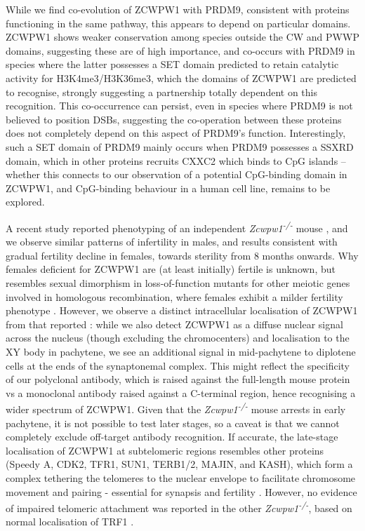 While we find co-evolution of ZCWPW1 with PRDM9, consistent with proteins functioning in the same pathway, this appears to depend on particular domains.
ZCWPW1 shows weaker conservation among species outside the CW and PWWP domains, suggesting these are of high importance, and co-occurs with PRDM9 in species where the latter possesses a SET domain predicted to retain catalytic activity for H3K4me3/H3K36me3, which the domains of ZCWPW1 are predicted to recognise, strongly suggesting a partnership totally dependent on this recognition.
This co-occurrence can persist, even in species where PRDM9 is not believed to position DSBs, suggesting the co-operation between these proteins does not completely depend on this aspect of PRDM9’s function.
Interestingly, such a SET domain of PRDM9 mainly occurs when PRDM9 possesses a SSXRD domain, which in other proteins \parencite{Banito2018SS18SSX} recruits CXXC2 which binds to CpG islands – whether this connects to our observation of a potential CpG-binding domain in ZCWPW1, and CpG-binding behaviour in a human cell line, remains to be explored.

A recent study reported phenotyping of an independent \textit{Zcwpw1\textsuperscript{-/-}} mouse \parencite{Li2019histone}, and we observe similar patterns of infertility in males, and results consistent with gradual fertility decline in females, towards sterility from 8 months onwards.
Why females deficient for ZCWPW1 are (at least initially) fertile is unknown, but resembles sexual dimorphism in loss-of-function mutants for other meiotic genes involved in homologous recombination, where females exhibit a milder fertility phenotype \parencite{Cahoon2019Leagues, Morelli2005Not, Zhang2019meiosisspecific}.
However, we observe a distinct intracellular localisation of ZCWPW1 from that reported \parencite{Li2019histone}: while we also detect ZCWPW1 as a diffuse nuclear signal across the nucleus (though excluding the chromocenters) and localisation to the XY body in pachytene, we see an additional signal in mid-pachytene to diplotene cells at the ends of the synaptonemal complex.
This might reflect the specificity of our polyclonal antibody, which is raised against the full-length mouse protein vs a monoclonal antibody raised against a C-terminal region, hence recognising a wider spectrum of ZCWPW1.
Given that the \textit{Zcwpw1\textsuperscript{-/-}} mouse arrests in early pachytene, it is not possible to test later stages, so a caveat is that we cannot completely exclude off-target antibody recognition.
If accurate, the late-stage localisation of ZCWPW1 at subtelomeric regions resembles other proteins (Speedy A, CDK2, TFR1, SUN1, TERB1/2, MAJIN, and KASH), which form a complex tethering the telomeres to the nuclear envelope to facilitate chromosome movement and pairing - essential for synapsis and fertility \parencite{Ashley2001Localization, Ding2007SUN1, Horn2013mammalian, Shibuya2014TRF1binding, Tu2017Speedy}.
However, no evidence of impaired telomeric attachment was reported in the other \textit{Zcwpw1\textsuperscript{-/-}}, based on normal localisation of TRF1 \parencite{Li2019histone}.


